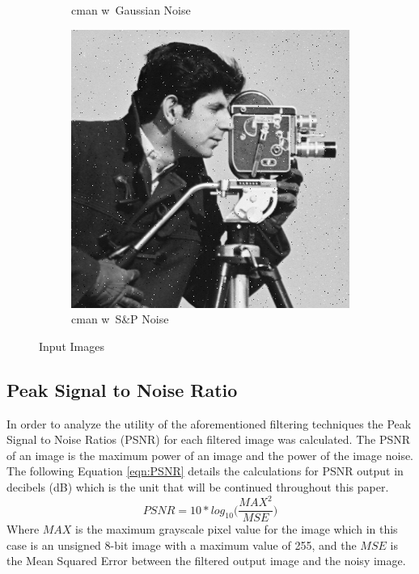 \documentclass{article}\raggedbottom
\begin{document}
\begin{figure}[h!]
\begin{subfigure}[b]{0.45\linewidth}
		\caption{cman w\ Gaussian Noise}
	\end{subfigure}
	\begin{subfigure}[b]{0.45\linewidth}
		\includegraphics[width=\linewidth]{../../2_Software/data/cman_spnoise.png}
		\caption{cman w\ S\&P Noise}
	\end{subfigure}
	\caption{Input Images}
	\label{fig:input_images}
\end{figure}

\subsection{Peak Signal to Noise Ratio}
In order to analyze the utility of the aforementioned filtering techniques the Peak Signal to Noise Ratios (PSNR) for each filtered image was calculated. The PSNR of an image is the maximum power of an image and the power of the image noise. The following Equation \eqref{eqn:PSNR} details the calculations for PSNR output in decibels (dB) which is the unit that will be continued throughout this paper.
\begin{equation}\label{eqn:PSNR}
PSNR = 10*log_{10}\Big(\frac{MAX^2}{MSE}\Big)
\end{equation}	 
Where $MAX$ is the maximum grayscale pixel value for the image which in this case is an unsigned 8-bit image with a maximum value of 255, and the $MSE$ is the Mean Squared Error between the filtered output image and the noisy image.
\end{document}
